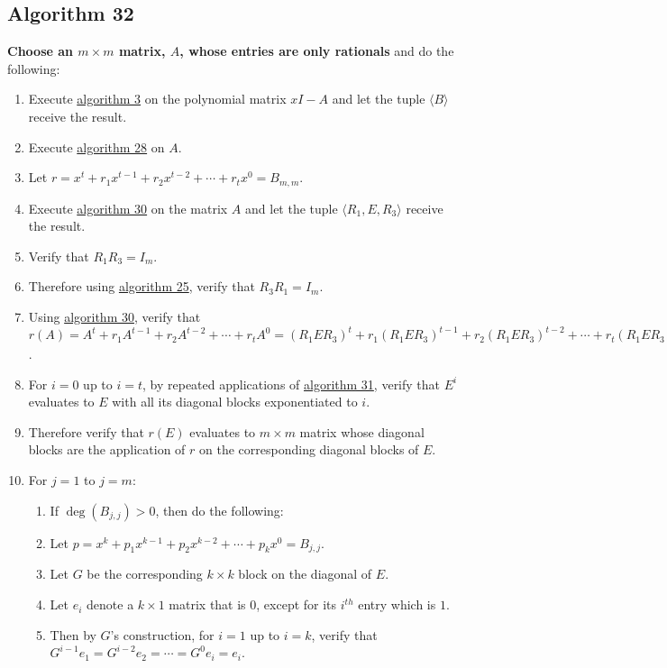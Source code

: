 \documentclass[twocolumn]{article}
\begin{document}
		\subsection{Algorithm 32}\label{sec:algorithm 32}
			\textbf{Choose an $m\times m$ matrix, $A$, whose entries are only rationals} and do the following:
			\begin{enumerate}
				\item Execute \hyperref[sec:algorithm 3]{algorithm 3} on the polynomial matrix $xI-A$ and let the tuple $\langle B\rangle$ receive the result.
				\item Execute \hyperref[sec:algorithm 28]{algorithm 28} on $A$.
				\item Let $r=x^t+r_1x^{t-1}+r_2x^{t-2}+\cdots+r_tx^0=B_{m,m}$.
				\item Execute \hyperref[sec:algorithm 30]{algorithm 30} on the matrix $A$ and let the tuple $\langle R_1,E,R_3\rangle$ receive the result.
				\item Verify that $R_1R_3=I_m$.
				\item Therefore using \hyperref[sec:algorithm 25]{algorithm 25}, verify that $R_3R_1=I_m$.
				\item Using \hyperref[sec:algorithm 30]{algorithm 30}, verify that $r(A)=A^t+r_1A^{t-1}+r_2A^{t-2}+\cdots+r_tA^0=(R_1ER_3)^t+r_1(R_1ER_3)^{t-1}+r_2(R_1ER_3)^{t-2}+\cdots+r_t(R_1ER_3)^0=R_1(E^t+r_1E^{t-1}+r_2E^{t-2}+\cdots+r_tE^0)R_3=R_1r(E)R_3$.
				\item For $i=0$ up to $i=t$, by repeated applications of \hyperref[sec:algorithm 31]{algorithm 31}, verify that $E^i$ evaluates to $E$ with all its diagonal blocks exponentiated to $i$.
				\item Therefore verify that $r(E)$ evaluates to $m\times m$ matrix whose diagonal blocks are the application of $r$ on the corresponding diagonal blocks of $E$.
				\item For $j=1$ to $j=m$:
				\begin{enumerate}
					\item If $\deg(B_{j,j})>0$, then do the following:
					\item Let $p=x^k+p_1x^{k-1}+p_2x^{k-2}+\cdots+p_kx^0=B_{j,j}$.
					\item Let $G$ be the corresponding $k\times k$ block on the diagonal of $E$.
					\item Let $e_i$ denote a $k\times 1$ matrix that is $0$, except for its $i^{th}$ entry which is $1$.
					\item Then by $G$'s construction, for $i=1$ up to $i=k$, verify that $G^{i-1}e_1=G^{i-2}e_2=\cdots=G^{0}e_i=e_i$.

\end{enumerate}
\end{enumerate}
\end{document}
